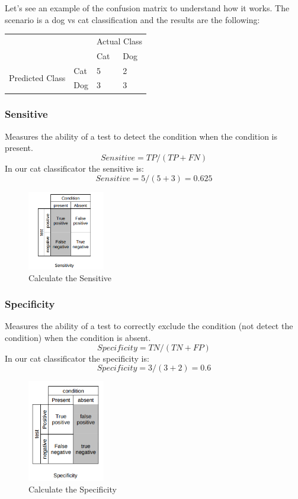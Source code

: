 Let's see an example of the confusion matrix to understand how it works. 
The scenario is a dog vs cat classification and the results are the following:
\begin{table}[H]
\centering
\begin{tabular}{llll}
\multicolumn{2}{l}{}                   & \multicolumn{2}{l}{Actual Class}  \\
\multicolumn{2}{l}{}                   & Cat & Dog                         \\
\multirow{2}{*}{Predicted Class} & Cat & 5   & 2                           \\
                                 & Dog & 3   & 3                          
\end{tabular}
\end{table}

\subsubsection[Sensitive]{Sensitive}
Measures the ability of a test to detect the condition when the condition is present.
\[ Sensitive = TP/(TP+FN) \]
In our cat classificator the sensitive is:
\[ Sensitive = 5/(5+3) = 0.625 \]

\begin{figure}[H]
\centering
\includegraphics[width=0.3\textwidth]{./figures/Sensitive}
\caption{Calculate the Sensitive}
\end{figure}

\subsubsection[Specificity]{Specificity}
Measures the ability of a test to correctly exclude the condition (not detect the condition) when the condition is absent.
\[ Specificity  = TN/(TN+FP) \]
In our cat classificator the specificity is:
\[ Specificity = 3/(3+2) = 0.6 \]

\begin{figure}[H]
\centering
\includegraphics[width=0.3\textwidth]{./figures/Specificity}
\caption{Calculate the Specificity}
\end{figure}


